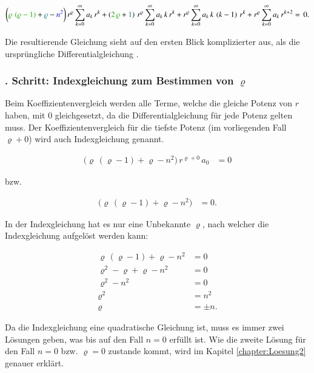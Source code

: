 \begin{align}
	\biggl(
	\textcolor{mygreen}{\varrho \, \left( \varrho - 1 \right)}
	+ 
	\textcolor{teal}{\varrho}
	-
	\textcolor{blue}{n^2}
	\biggr)
	\, r^{\varrho}
	\sum_{k=0}^{\infty} a_k \, r^k
	+ 
	\left(	
	\textcolor{mygreen}{2 \, \varrho}
	+
	\textcolor{teal}{1}
	\right)
	\, r^{\varrho}
	\sum_{k=0}^{\infty} a_k \, k \, r^k
	+
	r^{\varrho}
	\sum_{k=0}^{\infty} a_k \, k \, \left( k - 1 \right) \, r^k
	+ 
	r^{\varrho}
	\sum_{k=0}^{\infty} a_k \, r^{k + 2}
	= \, 0
	\label{eq:bessel:potenzreihe:dgl:vereinfacht}
	\text{.}
\end{align}
\begin{normalsize}%
Die resultierende Gleichung  sieht auf den ersten Blick komplizierter aus,
als die urspr\"ungliche Differentialgleichung .
\end{normalsize}
\subsubsection{. Schritt: Indexgleichung zum Bestimmen von $\varrho$}
\begin{normalsize}%
Beim Koeffizientenvergleich werden alle Terme,
welche die gleiche Potenz von $r$ haben,
mit $0$ gleichgesetzt,
da die Differentialgleichung f\"ur jede Potenz gelten muss.
Der Koeffizientenvergleich f\"ur die tiefste Potenz (im vorliegenden Fall $\varrho + 0$) wird auch Indexgleichung genannt.
\end{normalsize}
\begin{align}
	\big( \varrho \, \left( \varrho -1 \right) + \varrho - n^2 \big)
	\, r^{\varrho + 0} \, a_0 &= 0
	\label{eq:bessel:indexgleichung:ausgangslage}
\end{align}
\begin{normalsize}%
bzw.
\end{normalsize}
\begin{align}
	\big( \varrho \, \left( \varrho -1 \right) + \varrho - n^2 \big) &= 0
	\label{eq:bessel:indexgleichung:ausgangslage:vereinfacht}
	\text{.}
\end{align}
\begin{normalsize}%
In der Indexgleichung  hat es nur eine Unbekannte $\varrho$,
nach welcher die Indexgleichung aufgel\"ost werden kann:
\end{normalsize}
\begin{align*}
	\varrho \, \left( \varrho -1 \right) + \varrho - n^2 &= 0 \\
	\varrho ^2 - \varrho + \varrho -n^2 &= 0  \\
	\varrho ^2 - n^2 &= 0 \\
	\varrho ^2 &= n^2 \\
	\varrho &= \pm n
	\text{.}
\end{align*}
\begin{normalsize}%
Da die Indexgleichung eine quadratische Gleichung ist,
muss es immer zwei L\"osungen geben,
was bis auf den Fall $n = 0$ erf\"ullt ist.
Wie die zweite L\"osung f\"ur den Fall $n = 0$ bzw. $\varrho = 0$ zustande kommt,
wird im Kapitel \ref{chapter:Loesung2} genauer erkl\"art.
\end{normalsize}
